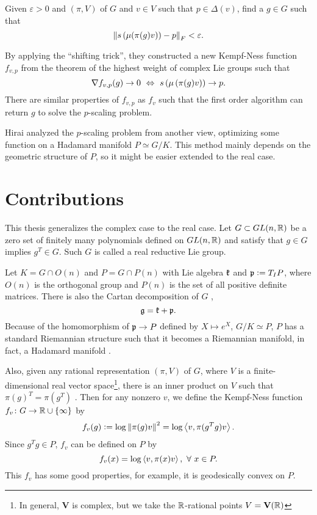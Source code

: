 \documentclass[suri,pdfbookmark]{engsuribt} %
\begin{document}
  \begin{prob}
    Given $\varepsilon > 0$ and $(\pi,V)$ of $G$ and $v \in V$ such that $p \in \Delta(v)$, find a $g \in G$ such that
    \begin{equation*}
      \left\lVert s\left(\mu(\pi(g)v)\right)-p\right\lVert_{F} < \varepsilon.
    \end{equation*}
  \end{prob}
  By applying the ``shifting trick'', they constructed a new Kempf-Ness function $f_{v,p}$ from the theorem of the highest weight of complex Lie groups such that
  \begin{equation*}
    \nabla f_{v,p}(g) \rightarrow 0 ~\Leftrightarrow~ s\left(\mu\left(\pi(g)v\right)\right) \rightarrow p.
  \end{equation*}
  There are similar properties of $f_{v,p}$ as $f_v$ such that the first order algorithm can return $g$ to solve the $p$-scaling problem.

  Hirai \cite{key12} analyzed the $p$-scaling problem from another view, optimizing some function on a Hadamard manifold $P \simeq G/K$. This method mainly depends on the geometric structure of $P$, so it might be easier extended to the real case.

  \section{Contributions}

  This thesis generalizes the complex case to the real case. Let $G \subset GL(n,\mathbb{R})$ be a zero set of finitely many polynomials defined on $GL(n,\mathbb{R})$ and satisfy that $g \in G$ implies $g^T \in G$. Such $G$ is called a real reductive Lie group. 

  Let $K = G \cap O(n)$ and $P = G \cap P(n)$ with Lie algebra $\mathfrak{k}$ and $\mathfrak{p} \vcentcolon= T_IP$, where $O(n)$ is the orthogonal group and $P(n)$ is the set of all positive definite matrices. There is also the Cartan decomposition of $G$ \cite{key5}, 
  \begin{equation*}
    \mathfrak{g} = \mathfrak{k} + \mathfrak{p}.
  \end{equation*}
  Because of the homomorphism of $\mathfrak{p} \rightarrow P$ defined by $X \mapsto e^X$, $G/K \simeq P$, $P$ has a standard Riemannian structure such that it becomes a Riemannian manifold, in fact, a Hadamard manifold \cite{key24}.

  Also, given any rational representation $(\pi,V)$ of $G$, where $V$ is a finite-dimensional real vector space\footnote{In general, $\mathbf{V}$ is complex, but we take the $\mathbb{R}$-rational points $V=\mathbf{V}(\mathbb{R})$}, there is an inner product on $V$ such that $\pi(g)^T = \pi(g^T)$ \cite{key16}. Then for any nonzero $v$, we define the Kempf-Ness function $f_v \colon G \rightarrow \mathbb{R}\cup \left\{\infty\right\}$ by
  \begin{equation*}
    f_v(g) \vcentcolon= \log \left\lVert\pi(g)v\right\lVert^2 = \log \left\langle v,\pi(g^Tg)v \right\rangle.
  \end{equation*}
  Since $g^Tg \in P$, $f_v$ can be defined on $P$ by
  \begin{equation*}
    f_v(x) = \log \left\langle v,\pi(x)v \right\rangle,~\forall~x \in P.
  \end{equation*}
  This $f_v$ has some good properties, for example, it is geodesically convex on $P$.
\end{document}
